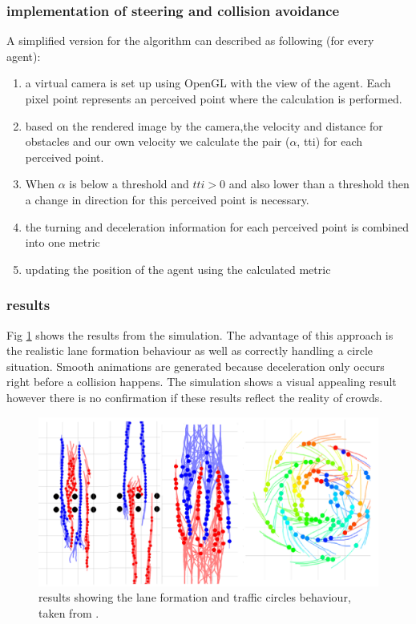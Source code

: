 \documentclass{acmsiggraph}               %
\begin{document}
\subsubsection{implementation of steering and collision avoidance} A simplified version for the algorithm can described as following (for every agent):
\begin{enumerate}
    \item a virtual camera is set up using OpenGL with the view of the agent. Each pixel point represents an perceived point where the calculation is performed. 
    \item based on the rendered image by the camera,the velocity and distance for obstacles and our own velocity we calculate the pair (\.{$\alpha$}, tti) for each perceived point.
    \item When \.{$\alpha$} is below a threshold and $tti > 0$ and also lower than a threshold then a change in direction for this perceived point is necessary. 
    \item the turning and deceleration information for each perceived point is combined into one metric 
    \item updating the position of the agent using the calculated metric
\end{enumerate}

\subsubsection{results}

Fig \ref{fig:visualResults} shows the results from the simulation. The advantage of this approach is the realistic lane formation behaviour as well as correctly handling a circle situation. Smooth animations are generated because deceleration only occurs right before a collision happens. The simulation shows a visual appealing result however there is no confirmation if these results reflect the reality of crowds.

\begin{figure}[h]
  \centering
  \includegraphics[width=1\linewidth]{images/visualApproach-results.png}
  \caption{results showing the lane formation  and traffic circles behaviour, taken from \protect\cite{ondrej_synthetic-vision_2010}.}
  \label{fig:visualResults}
\end{figure}
\end{document}
